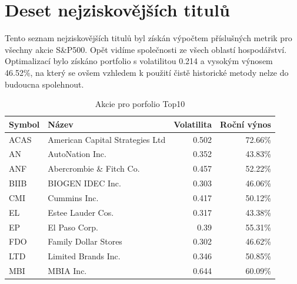 \documentclass[12pt,a4paper]{report}
\begin{document}
  \clearpage
  \section{Deset nejziskovějších titulů}
    Tento seznam nejziskovějších titulů byl získán výpočtem příslušných metrik pro všechny akcie S\&P500. Opět vidíme společnosti ze všech oblastí hospodářství. Optimalizací bylo získáno portfolio s volatilitou 0.214 a vysokým výnosem 46.52\%, na který se ovšem vzhledem k použití čistě historické metody nelze do budoucna spolehnout.
    \begin{table}[htb]
      \centering
      \begin{tabular}{|l|l|r|r|}
        \hline
        Symbol&Název&Volatilita&Roční výnos\\\hline\hline
        ACAS&American Capital Strategies Ltd &0.502&72.66\%\\\hline
        AN&AutoNation Inc. &0.352&43.83\%\\\hline
        ANF&Abercrombie \& Fitch Co. &0.457&52.22\%\\\hline
        BIIB&BIOGEN IDEC Inc. &0.303&46.06\%\\\hline
        CMI&Cummins Inc. &0.417&50.12\%\\\hline
        EL&Estee Lauder Cos. &0.317&43.38\%\\\hline
        EP&El Paso Corp. &0.39&55.31\%\\\hline
        FDO&Family Dollar Stores &0.302&46.62\%\\\hline
        LTD&Limited Brands Inc. &0.346&50.85\%\\\hline
        MBI&MBIA Inc. &0.644&60.09\%\\\hline
      \end{tabular}
      \caption{Akcie pro porfolio Top10}
    \end{table}
\end{document}
